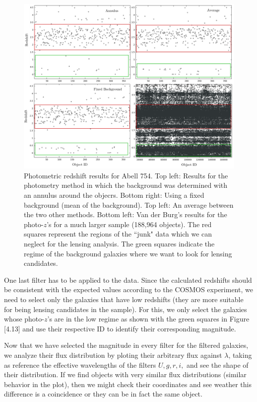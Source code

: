 \begin{figure}[H]
\centering
\includegraphics[width=15cm]{images/photo_z_red_squares.png}
\caption[Photometric redshift results for Abell 754]{Photometric redshift results for Abell 754. Top left: Results for the photometry method in which the background was determined with an annulus around the objecrs. Bottom right: Using a fixed background (mean of the background). Top left: An average between the two other methods. Bottom left: Van der Burg's results for the photo-$z$'s for a much larger sample (188,964 objects). The red squares represent the regions of the ``junk" data which we can neglect for the lensing analysis. The green squares indicate the regime of the background galaxies where we want to look for lensing candidates.}
\end{figure}

One last filter has to be applied to the data. Since the calculated redshifts should be consistent with the expected values according to the COSMOS experiment, we need to select only the galaxies that have low redshifts (they are more suitable for being lensing candidates in the sample). For this, we only select the galaxies whose photo-$z$'s are in the low regime as shown with the green squares in Figure [4.13] and use their respective ID to identify their corresponding magnitude. 

Now that we have selected the magnitude in every filter for the filtered galaxies, we analyze their flux distribution by ploting their arbitrary flux against $\lambda$, taking as reference the effective wavelengths of the filters $U,g,r,i,$ and see the shape of their distribution. If we find objects with very similar flux distributions (similar behavior in the plot), then we might check their coordinates and see weather this difference is a coincidence or they can be in fact the same object.

